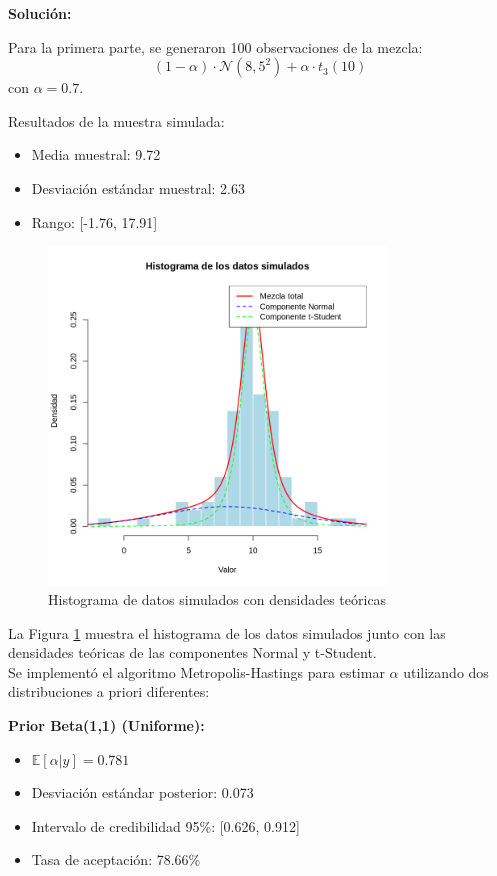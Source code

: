 \documentclass[12pt,a4paper]{article}
\begin{document}
\textbf{Solución:}

Para la primera parte, se generaron 100 observaciones de la mezcla:
\begin{equation*}
(1 - \alpha) \cdot \mathcal{N}(8, 5^2) + \alpha \cdot t_3(10)
\end{equation*}
con $\alpha = 0.7$.

Resultados de la muestra simulada:
\begin{itemize}
    \item Media muestral: 9.72
    \item Desviación estándar muestral: 2.63
    \item Rango: [-1.76, 17.91]
\end{itemize}

\begin{figure}[h]
\centering
\includegraphics[width=0.8\textwidth]{images/Problem3_1.png}
\caption{Histograma de datos simulados con densidades teóricas}
\label{fig:datos_problema3}
\end{figure}

La Figura \ref{fig:datos_problema3} muestra el histograma de los datos simulados junto con las densidades teóricas de las componentes Normal y t-Student. \\

Se implementó el algoritmo Metropolis-Hastings para estimar $\alpha$ utilizando dos distribuciones a priori diferentes:

\textbf{Prior Beta(1,1) (Uniforme):}
\begin{itemize}
    \item $\mathbb{E}[\alpha|y] = 0.781$
    \item Desviación estándar posterior: 0.073
    \item Intervalo de credibilidad 95\%: [0.626, 0.912]
    \item Tasa de aceptación: 78.66\%
\end{itemize}
\end{document}
